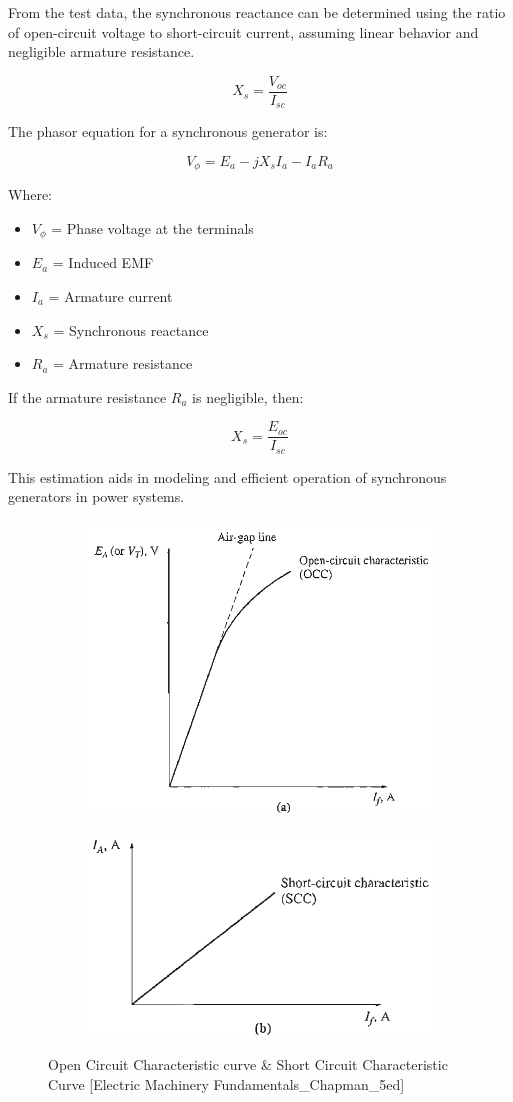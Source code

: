 \documentclass[a4paper,12pt]{article}
\begin{document}
	From the test data, the synchronous reactance can be determined using the ratio of open-circuit voltage to short-circuit current, assuming linear behavior and negligible armature resistance.
	
	\[
	X_s = \frac{V_{oc}}{I_{sc}}
	\]
	
	The phasor equation for a synchronous generator is:
	
	\[
	V_\phi = E_a - jX_s I_a - I_a R_a
	\]
	
	Where:
	\begin{itemize}
		\item $V_\phi$ = Phase voltage at the terminals
		\item $E_a$ = Induced EMF
		\item $I_a$ = Armature current
		\item $X_s$ = Synchronous reactance
		\item $R_a$ = Armature resistance
	\end{itemize}
	
	If the armature resistance $R_a$ is negligible, then:
	
	\[
	X_s = \frac{E_{oc}}{I_{sc}}
	\]
	
	This estimation aids in modeling and efficient operation of synchronous generators in power systems.
	
	
	
\begin{figure}[H]
	\centering

		\begin{subfigure}[t]{1\textwidth}
		\centering
		\includegraphics[width=0.5\linewidth]{Images/3}
		
		\vspace{2cm}
	\end{subfigure}
	
	\begin{subfigure}[t]{1\textwidth}
		\centering
		\includegraphics[width=0.5\linewidth]{Images/4}
		
	\end{subfigure}
		\caption{ Open Circuit Characteristic curve \& Short Circuit Characteristic Curve [Electric Machinery Fundamentals\_Chapman\_5ed]}
\end{figure}
\newpage
\end{document}
